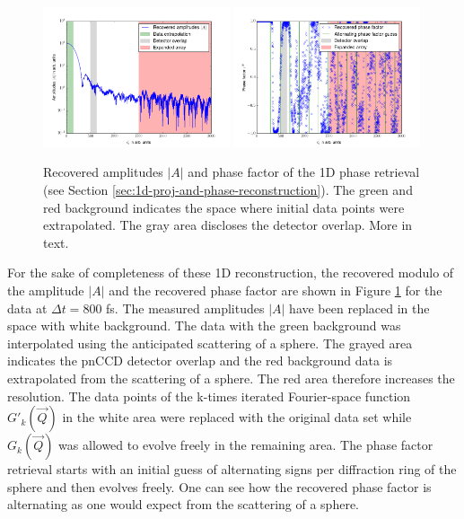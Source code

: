 \begin{figure}
	\centering
		\includegraphics[width=0.49\textwidth]{images/results/amplitude-discussion.png}
		\includegraphics[width=0.49\textwidth]{images/results/phase-discussion.png}
	\caption[Recovered Amplitudes $\left|A\right|$ and phase factor of 1D reconstruction]{Recovered amplitudes $\left|A\right|$ and phase factor of the 1D phase retrieval (see Section \ref{sec:1d-proj-and-phase-reconstruction}). The green and red background indicates the space where initial data points were extrapolated. The gray area discloses the detector overlap. More in text.}
	\label{fig:amplitude-phase}
\end{figure}
For the sake of completeness of these 1D reconstruction, the recovered modulo of the amplitude $\left|A\right|$ and the recovered phase factor are shown in Figure \ref{fig:amplitude-phase} for the data at $\Delta t =800$ fs. The measured amplitudes $\left|A\right|$ have been replaced in the space with white background. The data with the green background was interpolated using the anticipated scattering of a sphere. The grayed area indicates the pnCCD detector overlap and the red background data is extrapolated from the scattering of a sphere. The red area therefore increases the resolution. The data points of the k-times iterated Fourier-space function $G'_{k}(\vec{Q})$ in the white area were replaced with the original data set while $G_{k}(\vec{Q})$ was allowed to evolve freely in the remaining area. The phase factor retrieval starts with an initial guess of alternating signs per diffraction ring of the sphere and then evolves freely. One can see how the recovered phase factor is alternating as one would expect from the scattering of a sphere.\\
